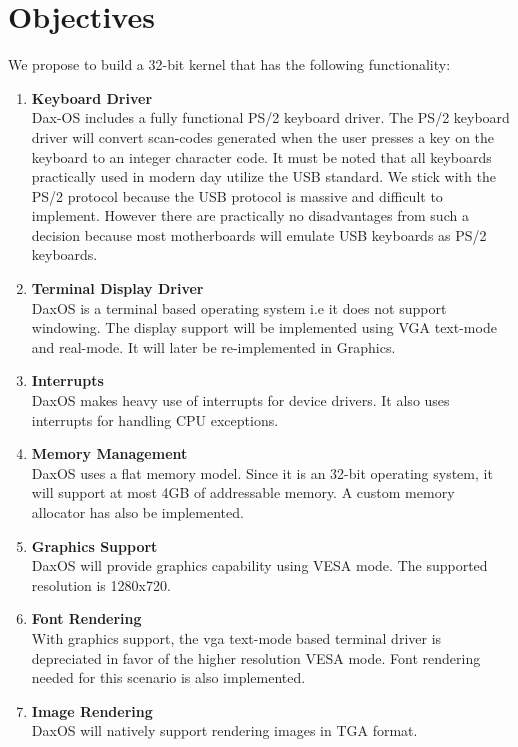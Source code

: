 \section{Objectives}\label{section:Objectives}
We propose to build a 32-bit kernel that has the following functionality:
\begin{enumerate}
	
	\item \textbf{Keyboard Driver} \\
	Dax-OS includes a fully functional PS/2 keyboard driver. The PS/2 keyboard driver will convert scan-codes generated when the user presses a key on the keyboard to an integer character code. It must be noted that all keyboards practically used in modern day utilize the USB standard. We stick with the PS/2 protocol because the USB protocol is massive and difficult to implement. However there are practically no disadvantages from such a decision because most motherboards will emulate USB keyboards as PS/2 keyboards.
	
	\item \textbf{Terminal Display Driver} \\
	DaxOS is a terminal based operating system i.e it does not support windowing.
	The display support will be implemented using VGA text-mode and real-mode.
	It will later be re-implemented in Graphics.
	
	\item \textbf{Interrupts}  \\
	DaxOS makes heavy use of interrupts for device drivers. It also uses interrupts for handling CPU exceptions. 

	\item \textbf{Memory Management} \\
	DaxOS uses a flat memory model.
	Since it is an 32-bit operating system, it will support at most 4GB of addressable memory. 
	A custom memory allocator has also be implemented.

	\item \textbf{Graphics Support} \\
	DaxOS will provide graphics capability using VESA mode. The supported resolution is 1280x720. 
	\pagebreak

	\item \textbf{Font Rendering} \\
	With graphics support, the vga text-mode based terminal driver is depreciated in favor of the higher resolution VESA mode.
	Font rendering needed for this scenario is also implemented.

	\item \textbf{Image Rendering} \\
	DaxOS will natively support rendering images in TGA format.
\end{enumerate}

